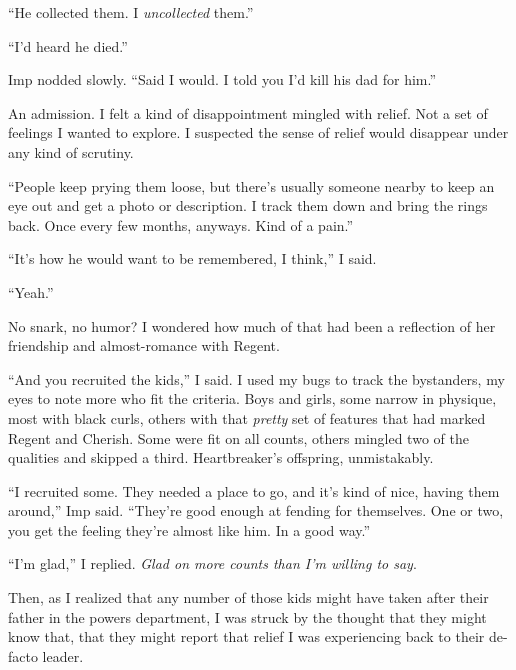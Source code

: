 ``He collected them.  I \emph{uncollected} them.''



``I'd heard he died.''



Imp nodded slowly.  ``Said I would.  I told you I'd kill his dad for him.''



An admission.  I felt a kind of disappointment mingled with relief.  Not a set of feelings I wanted to explore.  I suspected the sense of relief would disappear under any kind of scrutiny.



``People keep prying them loose, but there's usually someone nearby to keep an eye out and get a photo or description.  I track them down and bring the rings back.  Once every few months, anyways.  Kind of a pain.''



``It's how he would want to be remembered, I think,'' I said.



``Yeah.''



No snark, no humor?  I wondered how much of that had been a reflection of her friendship and almost-romance with Regent.



``And you recruited the kids,'' I said.  I used my bugs to track the bystanders, my eyes to note more who fit the criteria.  Boys and girls, some narrow in physique, most with black curls, others with that \emph{pretty }set of features that had marked Regent and Cherish.  Some were fit on all counts, others mingled two of the qualities and skipped a third.  Heartbreaker's offspring, unmistakably.



``I recruited some.  They needed a place to go, and it's kind of nice, having them around,'' Imp said.  ``They're good enough at fending for themselves.  One or two, you get the feeling they're almost like him.  In a good way.''



``I'm glad,'' I replied.  \emph{Glad on more counts than I'm willing to say}.



Then, as I realized that any number of those kids might have taken after their father in the powers department, I was struck by the thought that they might know that, that they might report that relief I was experiencing back to their de-facto leader.



